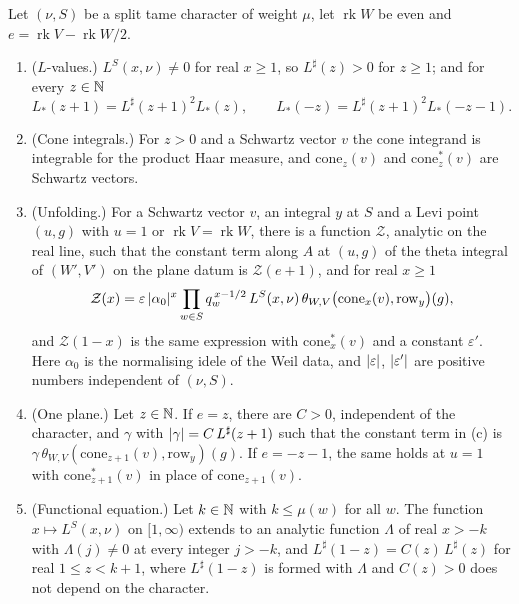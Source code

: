 \begin{theorem}\label{thm:B-tower}
Let $(\nu,S)$ be a split tame character of weight $\mu$, let $\operatorname{rk}W$ be even and $e=\operatorname{rk}V-\operatorname{rk}W/2$.
\begin{enumerate}[label=\textup{(\alph*)}]
\item ($L$-values.) $L^S(x,\nu)\ne0$ for real $x\ge1$, so $L^\sharp(z)>0$ for $z\ge1$; and for every $z\in\mathbb{N}$
\[
  L_*(z+1)=L^\sharp(z+1)^2L_*(z),\qquad L_*(-z)=L^\sharp(z+1)^2L_*(-z-1).
\]
\item (Cone integrals.) For $z>0$ and a Schwartz vector $v$ the cone integrand is integrable for the product Haar measure, and $\mathrm{cone}_z(v)$ and $\mathrm{cone}^*_z(v)$ are Schwartz vectors.
\item (Unfolding.) For a Schwartz vector $v$, an integral $y$ at $S$ and a Levi point $(u,g)$ with $u=1$ or $\operatorname{rk}V=\operatorname{rk}W$, there is a function $\mathcal Z$, analytic on the real
line, such that the constant term along $A$ at $(u,g)$ of the theta integral of $(W',V')$ on the plane datum is $\mathcal Z(e+1)$, and for real $x\ge1$
\[
  \mathcal Z(x)=\varepsilon\,\lvert \alpha_0\rvert^x\prod_{w\in S}q_w^{\,x-1/2}\,L^S(x,\nu)\,\theta_{W,V}\bigl(\mathrm{cone}_x(v),\mathrm{row}_y\bigr)(g),
\]
and $\mathcal Z(1-x)$ is the same expression with $\mathrm{cone}^*_x(v)$ and a constant $\varepsilon'$. Here $\alpha_0$ is the normalising idele of the Weil data, and $\lvert \varepsilon\rvert$, $\lvert \varepsilon'\rvert$ are
positive numbers independent of $(\nu,S)$.
\item (One plane.) Let $z\in\mathbb{N}$. If $e=z$, there are $C>0$, independent of the character, and $\gamma$ with $\lvert \gamma\rvert=C\,L^\sharp(z+1)$ such that the constant term in (c) is
$\gamma\,\theta_{W,V}(\mathrm{cone}_{z+1}(v),\mathrm{row}_y)(g)$. If $e=-z-1$, the same holds at $u=1$ with $\mathrm{cone}^*_{z+1}(v)$ in place of $\mathrm{cone}_{z+1}(v)$.
\item (Functional equation.) Let $k\in\mathbb{N}$ with $k\le\mu(w)$ for all $w$. The function $x\mapsto L^S(x,\nu)$ on $[1,\infty)$ extends to an analytic function $\Lambda$ of real $x>-k$ with $\Lambda(j)\ne0$
at every integer $j>-k$, and $L^\sharp(1-z)=C(z)\,L^\sharp(z)$ for real $1\le z<k+1$, where $L^\sharp(1-z)$ is formed with $\Lambda$ and $C(z)>0$ does not depend on the character.
\end{enumerate}
\end{theorem}
